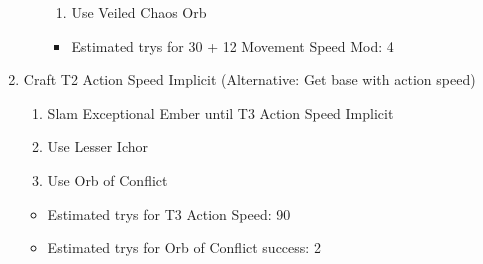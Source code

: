 \begin{enumerate}
\begin{itemize}
\begin{enumerate}
			\item Use Veiled Chaos Orb
		\end{enumerate}
		\begin{itemize}
			\item Estimated trys for 30 + 12  Movement Speed Mod: 4
		\end{itemize}
	\end{itemize}
	\item Craft T2 Action Speed Implicit (Alternative: Get base with action speed)
		\begin{enumerate}
			\item Slam Exceptional Ember until T3 Action Speed Implicit
			\item Use Lesser Ichor
			\item Use Orb of Conflict
		\end{enumerate}
		\begin{itemize}
			\item Estimated trys for T3 Action Speed: 90
			\item Estimated trys for Orb of Conflict success: 2
		\end{itemize}
\end{enumerate}

